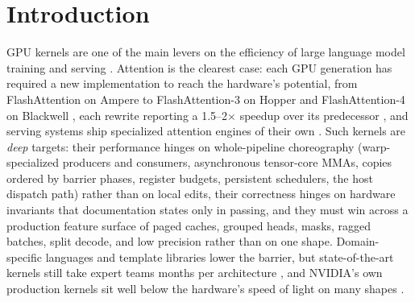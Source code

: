\section{Introduction}
\label{sec:intro}

GPU kernels are one of the main levers on the efficiency of large language model training and
serving \cite{miao2025servingsurvey}. Attention is the clearest case: each GPU generation has
required a new implementation to reach the hardware's potential, from FlashAttention on Ampere
\cite{dao2022flashattention,dao2024flashattention2} to FlashAttention-3 on Hopper
\cite{shah2024flashattention3} and FlashAttention-4 on Blackwell \cite{zadouri2026flashattention4},
each rewrite reporting a 1.5--2$\times$ speedup over its predecessor
\cite{dao2024flashattention2,shah2024flashattention3}, and serving systems ship specialized
attention engines of their own \cite{kwon2023vllm,ye2025flashinfer,miao2024specinfer}. Such kernels
are \emph{deep} targets: their performance hinges on whole-pipeline choreography (warp-specialized
producers and consumers, asynchronous tensor-core MMAs, copies ordered by barrier phases, register
budgets, persistent schedulers, the host dispatch path) rather than on local edits, their
correctness hinges on hardware invariants that documentation states only in passing, and they must
win across a production feature surface of paged caches, grouped heads, masks, ragged batches, split
decode, and low precision rather than on one shape. Domain-specific languages
\cite{tillet2019triton,spector2025thunderkittens} and template libraries \cite{nvidia2023cutlass}
lower the barrier, but state-of-the-art kernels still take expert teams months per architecture
\cite{shah2024flashattention3,zadouri2026flashattention4}, and NVIDIA's own production kernels sit
well below the hardware's speed of light on many shapes \cite{lin2026solexecbench}.

